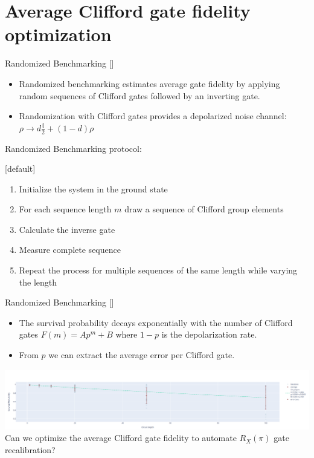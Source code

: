 \documentclass[aspectratio=169,10pt]{beamer}
\begin{document}
\section{Average Clifford gate fidelity optimization}

\begin{frame}[t,fragile]{Randomized Benchmarking [\cite{PhysRevA.77.012307}]}

  \begin{itemize}
    \item Randomized benchmarking estimates average gate fidelity by applying random sequences of Clifford gates followed by an inverting gate.
    \item Randomization with Clifford gates provides a depolarized noise channel: $\rho \rightarrow d \frac{\mathbb{I}}{2} + (1-d)\rho$
  \end{itemize}

  \vspace{3mm}
  Randomized Benchmarking protocol:
  {[default]
   \begin{enumerate}[leftmargin=*, label=\arabic*.]
     \item Initialize the system in the ground state
     \item For each sequence length $m$ draw a sequence of Clifford group elements
     \item Calculate the inverse gate 
     \item Measure complete sequence
     \item Repeat the process for multiple sequences of the same length while varying the length
  \end{enumerate}}
\end{frame}

\begin{frame}[t,fragile]{Randomized Benchmarking [\cite{PhysRevA.77.012307}]}
  \begin{itemize}
    \item The survival probability decays exponentially with the number of Clifford gates $F(m) = Ap^m + B$ where $1-p$ is the depolarization rate.\\
    \item From $p$ we can extract the average error per Clifford gate.\\
  \end{itemize}

  \begin{center}
    \vspace{0.5em}
    \includegraphics[width=\textwidth]{figures/rb.png}\\
    \vspace{1.25em}
    Can we optimize the average Clifford gate fidelity to automate $R_X(\pi)$ gate recalibration? 
  \end{center}
\end{frame}
\end{document}

